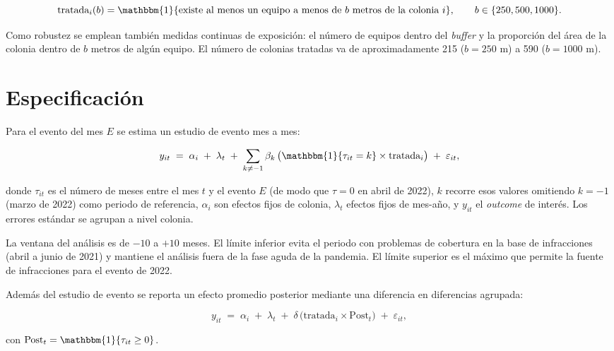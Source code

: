 \begin{equation}
\text{tratada}_i(b) = \mathbbm{1}\{\text{existe al menos un equipo a menos de } b \text{ metros de la colonia } i\},
\qquad b \in \{250, 500, 1000\}.
\end{equation}

Como robustez se emplean también medidas continuas de exposición: el número de
equipos dentro del \emph{buffer} y la proporción del área de la colonia dentro
de $b$ metros de algún equipo. El número de colonias tratadas va de
aproximadamente 215 ($b=250$ m) a 590 ($b=1000$ m).

\section{Especificación}

Para el evento del mes $E$ se estima un estudio de evento mes a mes:

\begin{equation}
\label{eq:event_study}
y_{it} \;=\; \alpha_i \;+\; \lambda_t \;+\;
\sum_{k \neq -1} \beta_k \,\bigl(\mathbbm{1}\{\tau_{it} = k\} \times \text{tratada}_i\bigr)
\;+\; \varepsilon_{it},
\end{equation}

donde $\tau_{it}$ es el número de meses entre el mes $t$ y el evento $E$ (de modo
que $\tau = 0$ en abril de 2022), $k$ recorre esos valores omitiendo $k=-1$
(marzo de 2022) como periodo de referencia, $\alpha_i$ son efectos fijos de
colonia, $\lambda_t$ efectos fijos de mes-año, y $y_{it}$ el \emph{outcome} de
interés. Los errores estándar se agrupan a nivel colonia.

La ventana del análisis es de $-10$ a $+10$ meses. El límite inferior evita el
periodo con problemas de cobertura en la base de infracciones (abril a junio de
2021) y mantiene el análisis fuera de la fase aguda de la pandemia. El límite
superior es el máximo que permite la fuente de infracciones para el evento de
2022.

Además del estudio de evento se reporta un efecto promedio posterior mediante
una diferencia en diferencias agrupada:

\begin{equation}
\label{eq:did}
y_{it} \;=\; \alpha_i \;+\; \lambda_t \;+\; \delta \,\bigl(\text{tratada}_i \times \text{Post}_t\bigr) \;+\; \varepsilon_{it},
\end{equation}

con $\text{Post}_t = \mathbbm{1}\{\tau_{it} \geq 0\}$.

